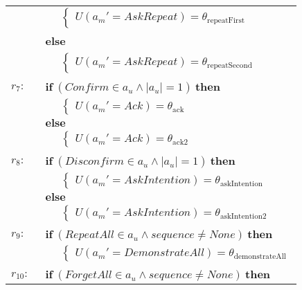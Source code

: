 \begin{footnotesize}
\begin{longtable}{p{1cm}l}
& $\;\;\;\;\; \begin{cases}U(\mathit{a_m}'\!=\!\mathit{AskRepeat})\!=\!\theta_{\mathrm{repeatFirst}}\end{cases}$ \\ & \textbf{else} \\
& $\;\;\;\;\; \begin{cases}U(\mathit{a_m}'\!=\!\mathit{AskRepeat})\!=\!\theta_{\mathrm{repeatSecond}}\end{cases}$ \\ \\[-1mm]
$r_{7}: \ \ $& $\textbf{if} \ (\mathit{Confirm}\!\in\!\mathit{a_u} \land \mathit{|a_u|}\!=\!\mathit{1}) \ \textbf{then}$ \\
& $\;\;\;\;\; \begin{cases}U(\mathit{a_m}'\!=\!\mathit{Ack})\!=\!\theta_{\mathrm{ack}}\end{cases}$ \\ 
& $\textbf{else}$ \\
& $\;\;\;\;\; \begin{cases}U(\mathit{a_m}'\!=\!\mathit{Ack})\!=\!\theta_{\mathrm{ack2}}\end{cases}$ \\ \\[-1mm]
$r_{8}: \ \ $& $\textbf{if} \ (\mathit{Disconfirm}\!\in\!\mathit{a_u} \land \mathit{|a_u|}\!=\!\mathit{1}) \ \textbf{then}$ \\
& $\;\;\;\;\; \begin{cases}U(\mathit{a_m}'\!=\!\mathit{AskIntention})\!=\!\theta_{\mathrm{askIntention}}\end{cases}$ \\ 
& $\textbf{else}$ \\
& $\;\;\;\;\; \begin{cases}U(\mathit{a_m}'\!=\!\mathit{AskIntention})\!=\!\theta_{\mathrm{askIntention2}}\end{cases}$\\ \\[-1mm]
$r_{9}: \ \ $& $\textbf{if} \ (\mathit{RepeatAll}\!\in\!\mathit{a_u} \land \mathit{sequence}\!\neq\!\mathit{None}) \ \textbf{then}$ \\
& $\;\;\;\;\; \begin{cases}U(\mathit{a_m}'\!=\!\mathit{DemonstrateAll})\!=\!\theta_{\mathrm{demonstrateAll}}\end{cases}$\\ \\[-1mm]
$r_{10}: \ \ $& $\textbf{if} \ (\mathit{ForgetAll}\!\in\!\mathit{a_u} \land \mathit{sequence}\!\neq\!\mathit{None}) \ \textbf{then}$ \\

\end{longtable}
\end{footnotesize}

